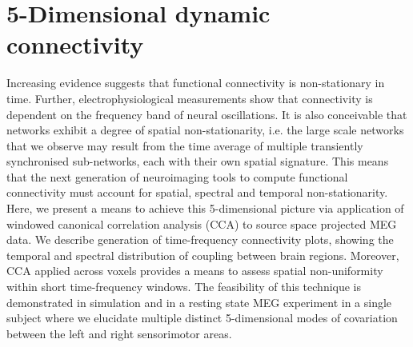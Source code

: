 \chapter{5-Dimensional dynamic connectivity}\label{chapter_cca}

Increasing evidence suggests that functional connectivity is non-stationary in time. Further, electrophysiological measurements show that connectivity is dependent on the frequency band of neural oscillations. It is also conceivable that networks exhibit a degree of spatial non-stationarity, i.e. the large scale networks that we observe may result from the time average of multiple transiently synchronised sub-networks, each with their own spatial signature. This means that the next generation of neuroimaging tools to compute functional connectivity must account for spatial, spectral and temporal non-stationarity. Here, we present a means to achieve this 5-dimensional picture via application of windowed canonical correlation analysis (CCA) to source space projected MEG data. We describe generation of time-frequency connectivity plots, showing the temporal and spectral distribution of coupling between brain regions. Moreover, CCA applied across voxels provides a means to assess spatial non-uniformity within short time-frequency windows. The feasibility of this technique is demonstrated in simulation and in a resting state MEG experiment in a single subject where we elucidate multiple distinct 5-dimensional modes of covariation between the left and right sensorimotor areas.

\doublespacing
